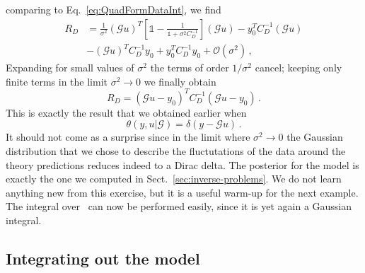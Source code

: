 comparing to Eq.~\ref{eq:QuadFormDataInt}, we find
\begin{equation}
    \label{eq:RDBeforeLimit}  
    \begin{split}
    R_D 
    &= \frac{1}{\sigma^2} \left(\mathcal{G}u\right)^T 
    \left[
        \mathds{1} - \frac{1}{\mathds{1}+\sigma^2 C_D^{-1}} 
    \right]
    \left(\mathcal{G}u\right) - y_0^T C_D^{-1} \left(\mathcal{G}u\right) \nonumber \\
    &- \left(\mathcal{G}u\right)^T C_D^{-1} y_0 + y_0^T C_D^{-1} y_0 + \mathcal{O}(\sigma^2)\, ,       
    \end{split} 
\end{equation}
Expanding for small values of $\sigma^2$ the terms of order $1/\sigma^2$ cancel;
keeping only finite terms in the limit $\sigma^2 \to 0$ we finally obtain
\begin{equation}
    \label{eq:RDAfterLimit}
    R_D = \left(\mathcal{G}u - y_0\right)^T C_D^{-1}
    \left(\mathcal{G}u - y_0\right)\, .
\end{equation}
This is exactly the result that we obtained earlier when 
\begin{equation}
    \label{eq:RemindTheta}
    \theta(y,u|\mathcal{G}) = \delta(y-\mathcal{G}u)\, .
\end{equation}
It should not come as a surprise since in the limit where $\sigma^2 \to 0$ the
Gaussian distribution that we chose to describe the fluctutations of the data
around the theory predictions reduces indeed to a Dirac delta. The posterior for
the model is exactly the one we computed in Sect.~\ref{sec:inverse-problems}. We
do not learn anything new from this exercise, but it is a useful warm-up for the
next example. The integral over \obs\ can now be performed easily, since it is
yet again a Gaussian integral. 


\subsection{Integrating out the model}
\label{eq:IntModOut}

